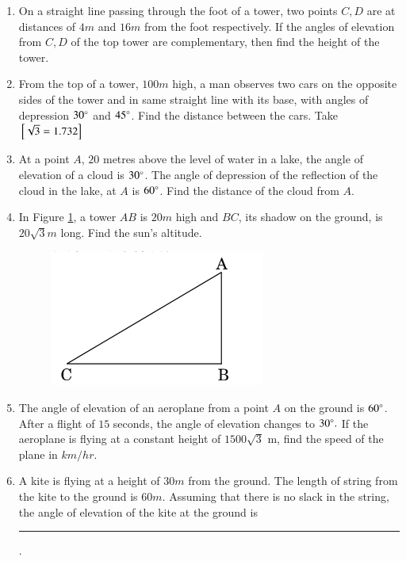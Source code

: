 \begin{enumerate}[label=\thesubsection.\arabic*.,ref=\thesubsection.\theenumi]
\hfill{}\item On a straight line passing through the foot of a tower, two points $C, D$ are at distances of $4m$ 
and $16m$ from the foot respectively. If the angles of elevation from $C, D$ of the top tower are complementary, then find the height of the tower.  
\hfill{}\item From the top of a tower, $100m$ high, a man observes two cars on the opposite sides of the tower and in same straight line with its base, with angles of depression $30\degree$ and $45\degree$. Find the distance between the cars.
Take ${}\left[\sqrt{3} = 1.732\right]$
\hfill{}
\item At a point $A$, $20$ metres above the level of water in a lake, the angle of elevation of a cloud is $30 \degree$. The angle of depression of the reflection of the cloud in the lake, at $A$ is $60\degree $. Find the distance of the cloud from $A$.
\hfill{}\item In Figure \ref{Figure 1},  a tower $AB$ is $20m$ high and $BC$,  its shadow on the ground, is $20\sqrt{3}m$ long. Find the sun's altitude.
\begin{figure}[H]
	\centering
    \includegraphics[width=\columnwidth]{cbse/figs/cbse_30_3_1.png}
	\caption{}
	\label{Figure 1}
\end{figure}
\hfill{}\item The angle of elevation of an aeroplane from a point $A$ on the ground is $60 \degree  $. After a flight of $15$ seconds, the angle of elevation changes to $  30 \degree.$ If the aeroplane is flying at a constant height of $1500\sqrt{3}$ m, find the speed of the plane in $km/hr$.
\hfill{}
\item A kite is flying at a height of $30 { m}$ from the ground. The length of string from the kite to the ground is $60 { m}$. Assuming that there is no slack in the string, the angle of elevation of the kite at the ground is \rule{1cm}{0.1pt}. 

\end{enumerate}
